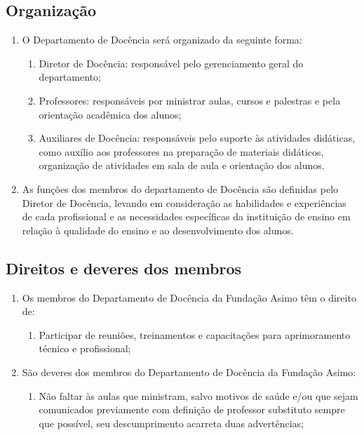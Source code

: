         \subsection{Organização}
        \begin{enumerate}
            \item O Departamento de Docência será organizado da seguinte forma:
            \begin{enumerate}
                \item  Diretor de Docência: responsável pelo gerenciamento geral do departamento;
                \item Professores: responsáveis por ministrar aulas, cursos e palestras e pela orientação acadêmica dos alunos;
                \item Auxiliares de Docência: responsáveis pelo suporte às atividades didáticas, como auxílio aos professores na preparação de materiais didáticos, organização de atividades em sala de aula e orientação dos alunos.
            \end{enumerate}
            \item As funções dos membros do departamento de Docência são definidas pelo Diretor de Docência, levando em consideração as habilidades e experiências de cada profissional e as necessidades específicas da instituição de ensino em relação à qualidade do ensino e ao desenvolvimento dos alunos.
        \end{enumerate}
        
        \subsection{Direitos e deveres dos membros}
        \begin{enumerate}
            \item Os membros do Departamento de Docência da Fundação Asimo têm o direito de:
            \begin{enumerate}
                \item Participar de reuniões, treinamentos e capacitações para aprimoramento técnico e profissional;
            \end{enumerate}
            \item São deveres dos membros do Departamento de Docência da Fundação Asimo:
            \begin{enumerate}
                \item Não faltar às aulas que ministram, salvo motivos de saúde e/ou que sejam comunicados previamente com definição de professor substituto sempre que possível, seu descumprimento acarreta duas advertências; 
            \end{enumerate}
        \end{enumerate}
        
